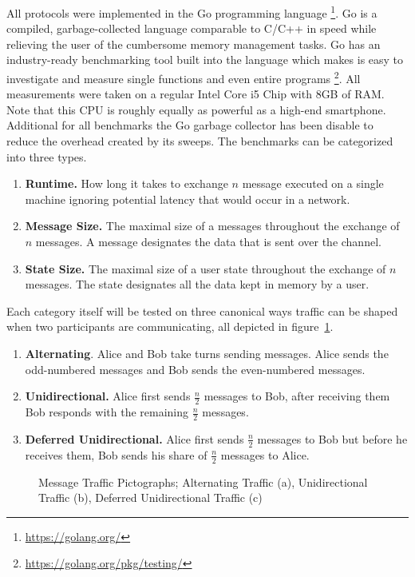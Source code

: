 \documentclass[11pt,a4paper,twoside,openright,bibliography=totoc]{scrbook}
\begin{document}
All protocols were implemented in the Go programming
language \footnote{\url{https://golang.org/}}. Go is a compiled,
garbage-collected language comparable to C/C++ in speed
while relieving the user of the cumbersome memory management
tasks. Go has an industry-ready benchmarking tool built
into the language which makes is easy to investigate and
measure single functions and even entire
programs \footnote{\url{https://golang.org/pkg/testing/}}.
All measurements were taken on a regular Intel Core i5 Chip
with 8GB of RAM. Note that this CPU is roughly equally as
powerful as a high-end smartphone. Additional for all benchmarks
the Go garbage collector has been disable to reduce the
overhead created by its sweeps.
The benchmarks can be categorized into three types.
\begin{enumerate}
\item \textbf{Runtime.} How long it takes to exchange $n$ message executed
  on a single machine ignoring potential latency that would occur
  in a network.
\item \textbf{Message Size.} The maximal size of a messages
  throughout the exchange of $n$ messages. A message designates the data that is sent
  over the channel.
\item \textbf{State Size.} The maximal size of a user state
  throughout the exchange of $n$ messages. The state designates
  all the data kept in memory by a user.
\end{enumerate}
Each category itself will be tested on three canonical ways
traffic can be shaped when two participants are communicating,
all depicted in figure~\ref{fig:picto}.
\begin{enumerate}
\item \textbf{Alternating}. Alice and Bob take turns sending messages. Alice
  sends the odd-numbered messages and Bob sends the even-numbered messages.
\item \textbf{Unidirectional.} Alice first sends $\frac{n}{2}$ messages
  to Bob, after receiving them Bob responds with the remaining $\frac{n}{2}$ messages.
\item \textbf{Deferred Unidirectional.} Alice first sends $\frac{n}{2}$ messages
  to Bob but before he receives them, Bob sends his share of $\frac{n}{2}$
  messages to Alice.
\end{enumerate}

\begin{figure}[H]
  \centering
  \noindent\begin{subfigure}[t]{0.32\linewidth}
    \centering
    
    \caption{}
  \end{subfigure}%
  \begin{subfigure}[t]{0.32\linewidth}
    \centering
    
    \caption{}
  \end{subfigure}%
  \begin{subfigure}[t]{0.32\linewidth}
    \centering
    
    \caption{}
  \end{subfigure}
  \caption[Message Traffic Pictographs]{Message Traffic Pictographs;
    Alternating Traffic (a), Unidirectional
    Traffic (b), Deferred Unidirectional Traffic (c)}
  \label{fig:picto}
\end{figure}
\end{document}
